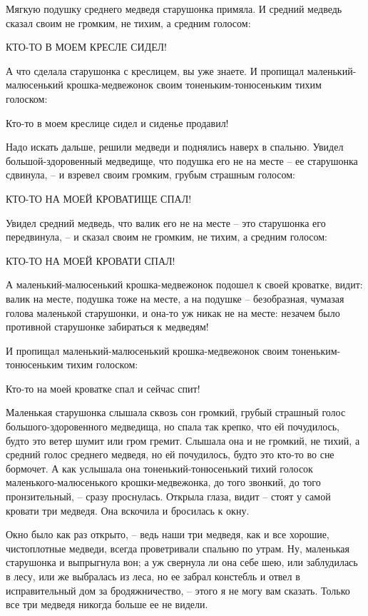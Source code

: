\documentclass[12pt]{article}
\begin{document}
Мягкую подушку среднего медведя старушонка примяла. И средний медведь сказал своим не громким, не тихим, а средним голосом:

КТО-ТО В МОЕМ КРЕСЛЕ СИДЕЛ!

А что сделала старушонка с креслицем, вы уже знаете. И пропищал маленький-малюсенький крошка-медвежонок своим тоненьким-тонюсеньким тихим голоском:

Кто-то в моем креслице сидел и сиденье продавил!

Надо искать дальше, решили медведи и поднялись наверх в спальню. Увидел большой-здоровенный медведище, что подушка его не на месте – ее старушонка сдвинула, – и взревел своим громким, грубым страшным голосом:

КТО-ТО НА МОЕЙ КРОВАТИЩЕ СПАЛ!

Увидел средний медведь, что валик его не на месте – это старушонка его передвинула, – и сказал своим не громким, не тихим, а средним голосом:

КТО-ТО НА МОЕЙ КРОВАТИ СПАЛ!

А маленький-малюсенький крошка-медвежонок подошел к своей кроватке, видит: валик на месте, подушка тоже на месте, а на подушке – безобразная, чумазая голова маленькой старушонки, и она-то уж никак не на месте: незачем было противной старушонке забираться к медведям!

И пропищал маленький-малюсенький крошка-медвежонок своим тоненьким-тонюсеньким тихим голоском:

Кто-то на моей кроватке спал и сейчас спит!

Маленькая старушонка слышала сквозь сон громкий, грубый страшный голос большого-здоровенного медведища, но спала так крепко, что ей почудилось, будто это ветер шумит или гром гремит. Слышала она и не громкий, не тихий, а средний голос среднего медведя, но ей почудилось, будто это кто-то во сне бормочет. А как услышала она тоненький-тонюсенький тихий голосок маленького-малюсенького крошки-медвежонка, до того звонкий, до того пронзительный, – сразу проснулась. Открыла глаза, видит – стоят у самой кровати три медведя. Она вскочила и бросилась к окну.

Окно было как раз открыто, – ведь наши три медведя, как и все хорошие, чистоплотные медведи, всегда проветривали спальню по утрам. Ну, маленькая старушонка и выпрыгнула вон; а уж свернула ли она себе шею, или заблудилась в лесу, или же выбралась из леса, но ее забрал констебль и отвел в исправительный дом за бродяжничество, – этого я не могу вам сказать. Только все три медведя никогда больше ее не видели.
\end{document}
